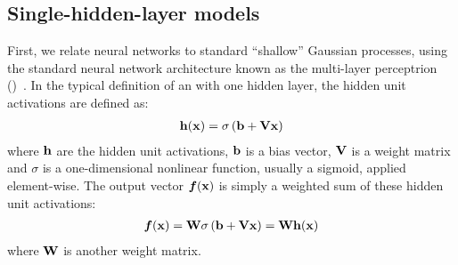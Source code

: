 \subsection{Single-hidden-layer models}

First, we relate neural networks to standard ``shallow'' Gaussian processes, using the standard neural network architecture known as the multi-layer perceptrion (\MLP{})~\citep{rosenblatt1962principles}.
In the typical definition of an \MLP{} with one hidden layer, the hidden unit activations are defined as:
%
\begin{align}
{\bf{h}}({\bf{x}}) = \sigma \left( {\bf{b}} + \mathbf{V} {\bf{x}} \right)
\end{align}
%
where ${\bf{h}}$ are the hidden unit activations, ${\bf{b}}$ is a bias vector, $\mathbf{V}$ is a weight matrix and $\sigma$ is a one-dimensional nonlinear function, usually a sigmoid, applied element-wise. The output vector $\boldsymbol{f}({\bf{x}})$ is simply a weighted sum of these hidden unit activations:
%
\begin{align}
\boldsymbol{f}({\bf{x}}) = \mathbf{W} \sigma \left( {\bf{b}} + \mathbf{V} {\bf{x}} \right)  = \mathbf{W} {\bf{h}}({\bf{x}})
\label{eq:one-layer-nn}
\end{align}
%
where $\mathbf{W}$ is another weight matrix.

